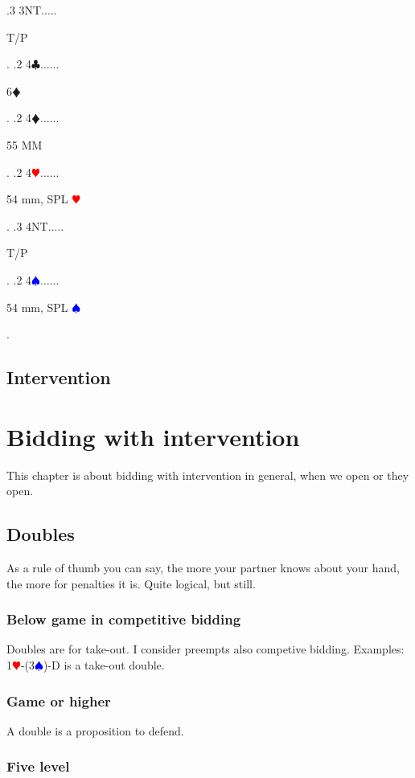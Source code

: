 \documentclass[a4paper]{article}
\newcommand{\BC}{\textcolor{OliveGreen}{$\clubsuit$}}
\newcommand{\BD}{\textcolor{RedOrange}{$\vardiamondsuit$}}
\newcommand{\BH}{\textcolor{Red}{$\varheartsuit${}}}
\newcommand{\BS}{\textcolor{Blue}{$\spadesuit${}}}
\begin{document}
{ .3 3NT.....\begin{minipage}[t]{0.8\textwidth}
T/P
\end{minipage}. 
 .2 4\BC......\begin{minipage}[t]{0.8\textwidth}
6\BD 
\end{minipage}. 
 .2 4\BD......\begin{minipage}[t]{0.8\textwidth}
55 MM
\end{minipage}. 
 .2 4\BH......\begin{minipage}[t]{0.8\textwidth}
54 mm, SPL \BH 
\end{minipage}. 
 .3 4NT.....\begin{minipage}[t]{0.8\textwidth}
T/P
\end{minipage}. 
 .2 4\BS......\begin{minipage}[t]{0.8\textwidth}
54 mm, SPL \BS 
\end{minipage}. 
}
\bigbreak
\subsection{Intervention}

\section{Bidding with intervention}

This chapter is about bidding with intervention in general, when we open or
they open.
\bigbreak
\subsection{Doubles}

As a rule of thumb you can say, the more your partner knows about your hand,
the more for penalties it is. Quite logical, but still.
\bigbreak
\subsubsection{Below game in competitive bidding}

Doubles are for take-out. I consider preempts also competive bidding.
\bigbreak
Examples: 1\BH -(3\BS )-D is a take-out double.
\bigbreak
\subsubsection{Game or higher}

A double is a proposition to defend.
\bigbreak
\subsubsection{Five level}
\end{document}
